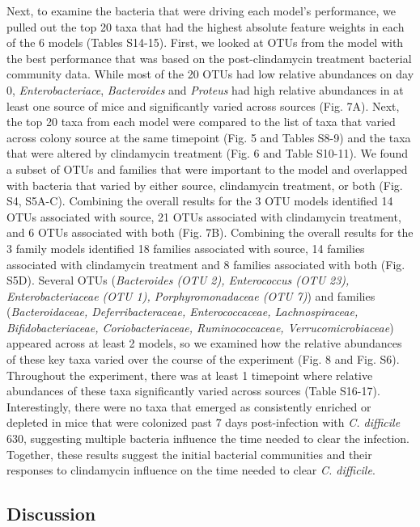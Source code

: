 \documentclass[11pt,]{article}
\begin{document}
Next, to examine the bacteria that were driving each model's
performance, we pulled out the top 20 taxa that had the highest absolute
feature weights in each of the 6 models (Tables S14-15). First, we
looked at OTUs from the model with the best performance that was based
on the post-clindamycin treatment bacterial community data. While most
of the 20 OTUs had low relative abundances on day 0,
\emph{Enterobacteriace}, \emph{Bacteroides} and \emph{Proteus} had high
relative abundances in at least one source of mice and significantly
varied across sources (Fig. 7A). Next, the top 20 taxa from each model
were compared to the list of taxa that varied across colony source at
the same timepoint (Fig. 5 and Tables S8-9) and the taxa that were
altered by clindamycin treatment (Fig. 6 and Table S10-11). We found a
subset of OTUs and families that were important to the model and
overlapped with bacteria that varied by either source, clindamycin
treatment, or both (Fig. S4, S5A-C). Combining the overall results for
the 3 OTU models identified 14 OTUs associated with source, 21 OTUs
associated with clindamycin treatment, and 6 OTUs associated with both
(Fig. 7B). Combining the overall results for the 3 family models
identified 18 families associated with source, 14 families associated
with clindamycin treatment and 8 families associated with both (Fig.
S5D). Several OTUs (\emph{Bacteroides (OTU 2), Enterococcus (OTU 23),
Enterobacteriaceae (OTU 1), Porphyromonadaceae (OTU 7)}) and families
(\emph{Bacteroidaceae, Deferribacteraceae, Enterococcaceae,
Lachnospiraceae, Bifidobacteriaceae, Coriobacteriaceae, Ruminococcaceae,
Verrucomicrobiaceae}) appeared across at least 2 models, so we examined
how the relative abundances of these key taxa varied over the course of
the experiment (Fig. 8 and Fig. S6). Throughout the experiment, there
was at least 1 timepoint where relative abundances of these taxa
significantly varied across sources (Table S16-17). Interestingly, there
were no taxa that emerged as consistently enriched or depleted in mice
that were colonized past 7 days post-infection with \emph{C. difficile}
630, suggesting multiple bacteria influence the time needed to clear the
infection. Together, these results suggest the initial bacterial
communities and their responses to clindamycin influence on the time
needed to clear \emph{C. difficile}.

\subsection{Discussion}\label{discussion}
\end{document}
